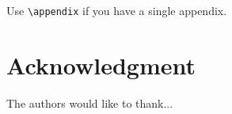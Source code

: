 \documentclass[lettersize,journal]{IEEEtran}
\begin{document}

Use \verb|\appendix| if you have a single appendix.

\section*{Acknowledgment}
The authors would like to thank...

\balance

\nocite{*} %


\end{document}
